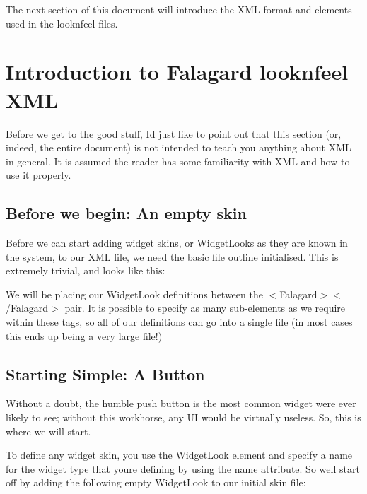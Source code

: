 The next section of this document will introduce the X\+ML format and elements used in the \textquotesingle{}looknfeel\textquotesingle{} files. \hypertarget{fal_tut1}{}\section{Introduction to Falagard \textquotesingle{}looknfeel\textquotesingle{} X\+ML}\label{fal_tut1}
Before we get to the good stuff, I\textquotesingle{}d just like to point out that this section (or, indeed, the entire document) is not intended to teach you anything about X\+ML in general. It is assumed the reader has some familiarity with X\+ML and how to use it properly.\hypertarget{fal_tut1_fal_tut1_empty_skin}{}\subsection{Before we begin\+: An empty skin}\label{fal_tut1_fal_tut1_empty_skin}
Before we can start adding widget skins, or Widget\+Looks as they are known in the system, to our X\+ML file, we need the basic file outline initialised. This is extremely trivial, and looks like this\+: 
\begin{DoxyCode}{0}
\end{DoxyCode}


We will be placing our Widget\+Look definitions between the {\ttfamily $<$Falagard$>$$<$/\+Falagard$>$} pair. It is possible to specify as many sub-\/elements as we require within these tags, so all of our definitions can go into a single file (in most cases this ends up being a very large file!)\hypertarget{fal_tut1_fal_tut1_button}{}\subsection{Starting Simple\+: A Button}\label{fal_tut1_fal_tut1_button}
Without a doubt, the humble push button is the most common widget we\textquotesingle{}re ever likely to see; without this workhorse, any UI would be virtually useless. So, this is where we will start.

To define any widget skin, you use the Widget\+Look element and specify a name for the widget type that you\textquotesingle{}re defining by using the name attribute. So we\textquotesingle{}ll start off by adding the following empty Widget\+Look to our initial skin file\+: 
\begin{DoxyCode}{0}
\end{DoxyCode}


